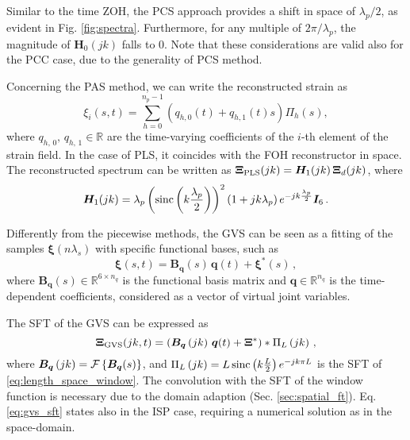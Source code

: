 Similar to the time \ac{ZOH}, the \ac{PCS} approach provides a shift in space of $\lambda_p / 2$, as evident in Fig. \ref{fig:spectra}. Furthermore, for any multiple of $2 \pi / \lambda_p$, the magnitude of $\bm{H}_0(jk)$ falls to 0. Note that these considerations are valid also for the \ac{PCC} case, due to the generality of \ac{PCS} method.

Concerning the \ac{PAS} method, we can write the reconstructed strain as
\begin{equation} \label{eq:pas_strain}
    \xi_i(s, t) = \sum_{h = 0}^{n_p - 1} \left(q_{h, 0}(t) + q_{h, 1}(t) s \right) \Pi_h\left(s\right) ,
\end{equation}
where $q_{h, \, 0}, \, q_{h, \, 1} \in \mathbb{R}$ are the time-varying coefficients of the $i$-th element of the strain field.
In the case of \ac{PLS}, it coincides with the \ac{FOH} reconstructor in space. The reconstructed spectrum can be written as $\bm{\Xi}_{\textnormal{PLS}}(jk) = \bm{H}_1(jk) \, \bm{\Xi}_d(jk)$, where
\begin{equation}
    \bm{H}_1(jk) =  \lambda_p \left(\textnormal{sinc}\left(k \frac{\lambda_p}{2}\right)\right)^2 \left(1 + jk \lambda_p\right) e^{-j k \frac{\lambda_p}{2}} \bm{I}_{6} \, .
\end{equation}

Differently from the piecewise methods, the \ac{GVS} can be seen as a fitting of the samples $\bm{\xi}(n \lambda_s)$ with specific functional bases, such as
\begin{equation} \label{eq:gvs_strain}
    \bm{\xi}(s, t) = \bm{B}_{\bm{q}}(s) \, \bm{q}(t) + \bm{\xi}^{*}(s) \, ,
\end{equation}
where $\bm{B}_{\bm{q}}(s) \in \mathbb{R}^{6 \times n_q}$ is the functional basis matrix and $\bm{q} \in \mathbb{R}^{n_q}$ is the time-dependent coefficients, considered as a vector of virtual joint variables.

The \ac{SFT} of the \ac{GVS} can be expressed as
\begin{equation} \label{eq:gvs_sft}
    \bm{\Xi}_{\textnormal{GVS}}(jk, t) = \left(\bm{B}_{\bm{q}}\left(jk\right) \, \bm{q}(t) + \bm{\Xi}^{*} \right) \ast \Pi_{L}\left(jk\right)\, , 
\end{equation}
where $\bm{B}_{\bm{q}}\left(jk\right) = \mathcal{F}\left\{\bm{B}_{\bm{q}}(s)\right\}$, and $\Pi_{L}\left(jk\right) = L \, \textnormal{sinc}\left(k \frac{L}{2}\right) e^{-j k \pi L}$ is the \ac{SFT} of \eqref{eq:length_space_window}. The convolution with the \ac{SFT} of the window function is necessary due to the domain adaption (Sec. \ref{sec:spatial_ft}). 
Eq. \eqref{eq:gvs_sft} states also in the \ac{ISP} case, requiring a numerical solution as in the space-domain.